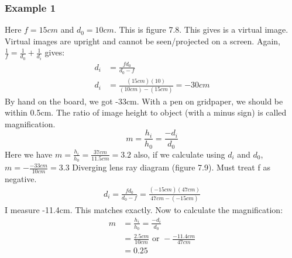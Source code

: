     \subsubsection{Example 1}
    Here $f=15cm$ and $d_0=10cm$. This is figure 7.8. This gives is a virtual image. Virtual images are upright and cannot be seen/projected on a screen. Again, $\frac{1}{f}=\frac{1}{d_0}+\frac{1}{d_i}$ gives:
    \begin{align*}
        d_i&=\frac{fd_0}{d_0-f}\\
        d_i&=\frac{(15cm)(10)}{(10cm)-(15cm)}=-30cm
    \end{align*}
    By hand on the board, we got -33cm. With a pen on gridpaper, we should be within 0.5cm.
    \newline\newline
    The ratio of image height to object (with a minus sign) is called magnification.
    \begin{equation*}
        m=\frac{h_i}{h_0}=\frac{-d_i}{d_0}
    \end{equation*}
    Here we have $m=\frac{h_i}{h_0}=\frac{37cm}{11.5cm}=3.2$ also, if we calculate using $d_i$ and $d_0$, $m=-\frac{-33cm}{10cm}=3.3$
    \newline\newline
    Diverging lens ray diagram (figure 7.9). Must treat f as negative. 
    \begin{align*}
        d_i=\frac{fd_0}{d_0-f}=\frac{(-15cm)(47cm)}{47cm-(-15cm)}
    \end{align*}
    I measure -11.4cm. This matches exactly. Now to calculate the magnification:
    \begin{align*}
        m&=\frac{h_i}{h_0}=\frac{-d_i}{d_0}\\
        &=\frac{2.5cm}{10cm}\text{ or }-\frac{-11.4cm}{47cm}\\
        &= 0.25
    \end{align*}
    

